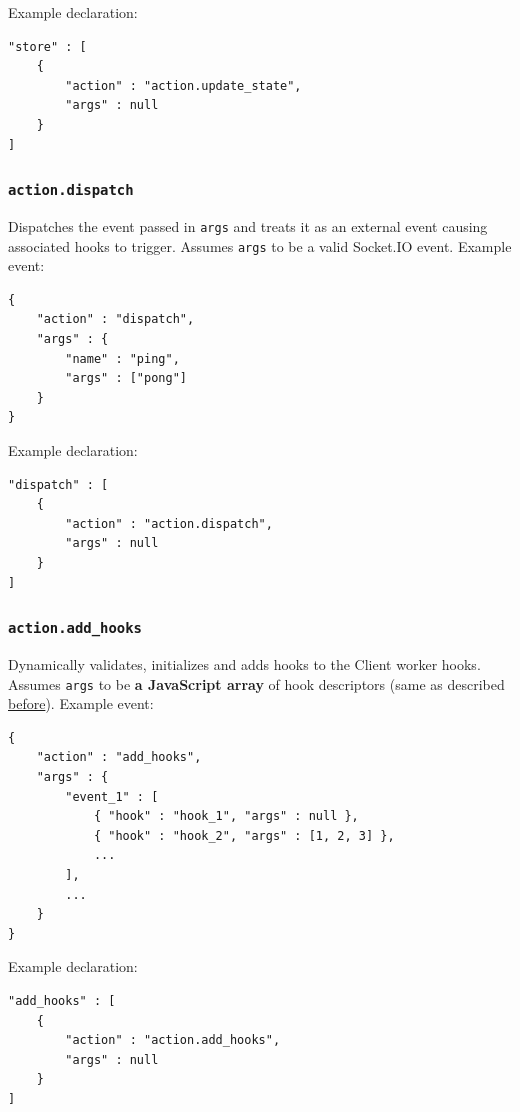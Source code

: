 \documentclass[a4paper]{article}
\begin{document}
\noindent
Example declaration:

\begin{verbatim}
"store" : [
    {
        "action" : "action.update_state",
        "args" : null
    }
]
\end{verbatim}
\subsubsection{\texttt{action.dispatch}}
\label{sec-9-3-5}

Dispatches the event passed in \texttt{args} and treats it as an external event causing associated hooks to trigger. Assumes \texttt{args} to be a valid Socket.IO event. Example event:

\begin{verbatim}
{
    "action" : "dispatch",
    "args" : {
        "name" : "ping",
        "args" : ["pong"]
    }
}
\end{verbatim}




\noindent
Example declaration:

\begin{verbatim}
"dispatch" : [
    {
        "action" : "action.dispatch",
        "args" : null
    }
]
\end{verbatim}
\subsubsection{\texttt{action.add\_hooks}}
\label{sec-9-3-6}

Dynamically validates, initializes and adds hooks to the Client worker hooks. Assumes \texttt{args} to be \textbf{a JavaScript array} of hook descriptors (same as described \hyperref[ref-hooks_config]{before}). Example event:

\begin{verbatim}
{
    "action" : "add_hooks",
    "args" : {
        "event_1" : [
            { "hook" : "hook_1", "args" : null },
            { "hook" : "hook_2", "args" : [1, 2, 3] },
            ...
        ],
        ...
    }
}
\end{verbatim}




\noindent
Example declaration:

\begin{verbatim}
"add_hooks" : [
    {
        "action" : "action.add_hooks",
        "args" : null
    }
]
\end{verbatim}
\end{document}

